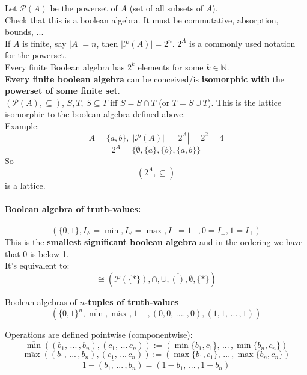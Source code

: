 	Let $\mathcal{P}(A)$ be the powerset of $A$ (set of all subsets of $A$).\\
	Check that this is a boolean algebra. It must be commutative, absorption, bounds, ...\\

	If $A$ is finite, say $|A| = n$, then $|\mathcal{P}(A)| = 2^n$. $2^A$ is a commonly used notation for the powerset.\\

	Every finite Boolean algebra has $2^k$ elements for some $k \in \mathbb{N}$.\\

	\textbf{Every finite boolean algebra} can be conceived/is \textbf{isomorphic with} the \textbf{powerset of some finite set}.\\

	$(\mathcal{P}(A), \subseteq)$, $S,T$, $S \subseteq T$ iff $S = S \cap T$ (or $T = S \cup T$). This is the lattice isomorphic to the boolean algebra defined above.\\

	Example:
	$$A = \{a,b\}, \; |\mathcal{P} (A)| = |2^A| = 2^2 = 4$$
	$$ 2^A = \{\emptyset, \{a\}, \{b\}, \{a,b\}\} $$
	So
	$$ (2^A, \subseteq)$$
	is a lattice.\\


	\newpage

	\paragraph{Boolean algebra of truth-values:}
	$$ (\{0,1\}, I_\wedge = \min, I_\vee = \max, I_\neg = 1-, 0 = I_\bot, 1 = I_\top) $$
	This is the \textbf{smallest significant boolean algebra} and in the ordering we have that 0 is below 1.\\

	It's equivalent to:
	$$ \cong (\mathcal{P}(\{\ast\}), \cap, \cup, \overline{()}, \emptyset, \{\ast\}) $$

	Boolean algebras of \textbf{$n$-tuples of truth-values}
	$$ (\{0,1\}^n, \overline{\min}, \overline{\max}, \overline{1-}, (0,0, \, .... \, , 0), (1,1, \, ... \, , 1)) $$

	Operations are defined pointwise (componentwise):
	$$ \overline{\min} ((b_1, \, ... \, , b_n), (c_1, \, ... \, c_n)) := (\min \{b_1, c_1\}, \, ... \, , \min \{b_n, c_n\})$$
	$$ \overline{\max} ((b_1, \, ... \, , b_n), (c_1, \, ... \, c_n)) := (\max \{b_1, c_1\}, \, ... \, , \max \{b_n, c_n\})$$
	$$ \overline{1 - (b_1, \, ... \, , b_n)} = (1-b_1, \, ... \, , 1-b_n) $$

